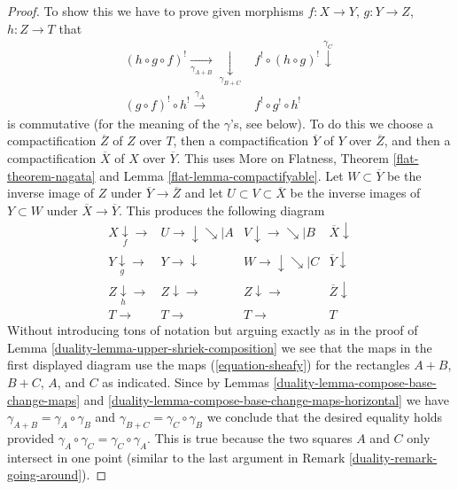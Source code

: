 \begin{proof}
To show this we have to prove given morphisms
$f : X \to Y$, $g : Y \to Z$, $h : Z \to T$
that
$$
\begin{array}{cc}(h \circ g \circ f)^! \underset{\gamma_{A + B}}{\longrightarrow}\underset{\gamma_{B + C}}{\downarrow} & f^! \circ (h \circ g)^! \overset{\gamma_C}{\downarrow} \\ (g \circ f)^! \circ h^! \overset{\gamma_A}{\longrightarrow} & f^! \circ g^! \circ h^!\end{array}
$$
is commutative (for the meaning of the $\gamma$'s, see below).
To do this we choose a compactification $\overline{Z}$
of $Z$ over $T$, then a compactification $\overline{Y}$ of $Y$ over
$\overline{Z}$, and then a compactification $\overline{X}$ of
$X$ over $\overline{Y}$. This uses
More on Flatness, Theorem \ref{flat-theorem-nagata} and
Lemma \ref{flat-lemma-compactifyable}.
Let $W \subset \overline{Y}$ be the inverse image of $Z$ under
$\overline{Y} \to \overline{Z}$ and let $U \subset V \subset \overline{X}$
be the inverse images of $Y \subset W$ under $\overline{X} \to \overline{Y}$.
This produces the following diagram
$$
\begin{array}{cccc}X \underset{f}{\downarrow}\longrightarrow & U \longrightarrow\downarrow\searrow|A & V \downarrow\longrightarrow\searrow|B & \overline{X} \downarrow \\ Y \underset{g}{\downarrow}\longrightarrow & Y \longrightarrow\downarrow & W \longrightarrow\downarrow\searrow|C & \overline{Y} \downarrow \\ Z \underset{h}{\downarrow}\longrightarrow & Z \downarrow\longrightarrow & Z \downarrow\longrightarrow & \overline{Z} \downarrow \\ T \longrightarrow & T \longrightarrow & T \longrightarrow & T\end{array}
$$
Without introducing tons of notation but arguing exactly
as in the proof of Lemma \ref{duality-lemma-upper-shriek-composition}
we see that the maps in the first displayed diagram use the
maps (\ref{equation-sheafy}) for the rectangles
$A + B$, $B + C$, $A$, and $C$ as indicated. Since by
Lemmas \ref{duality-lemma-compose-base-change-maps} and
\ref{duality-lemma-compose-base-change-maps-horizontal}
we have $\gamma_{A + B} = \gamma_A \circ \gamma_B$ and
$\gamma_{B + C} = \gamma_C \circ \gamma_B$  we conclude
that the desired equality holds provided
$\gamma_A \circ \gamma_C = \gamma_C \circ \gamma_A$.
This is true because the two squares $A$ and $C$ only
intersect in one point (similar to the last argument in
Remark \ref{duality-remark-going-around}).
\end{proof}

